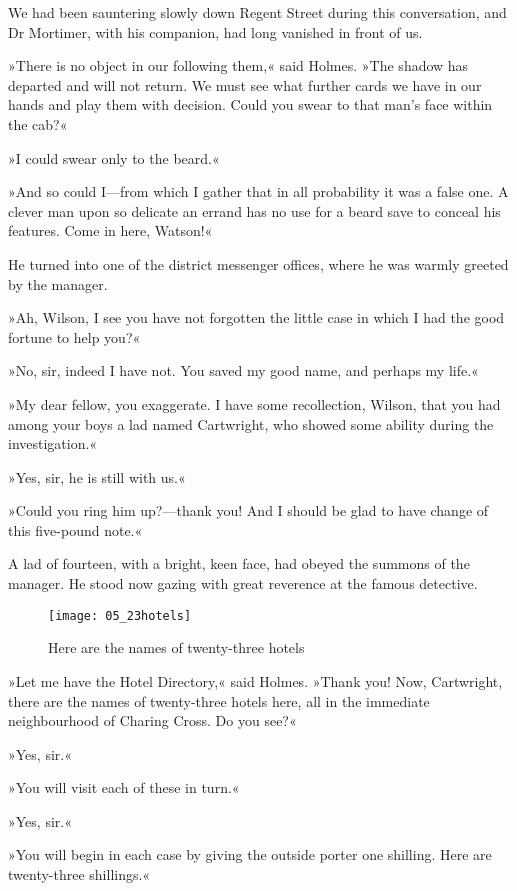 We had been sauntering slowly down Regent Street during this conversation, and Dr Mortimer, with his companion, had long vanished in front of us.

»There is no object in our following them,« said Holmes. »The shadow has departed and will not return. We must see what further cards we have in our hands and play them with decision. Could you swear to that man's face within the cab?«

»I could swear only to the beard.«

»And so could I—from which I gather that in all probability it was a false one. A clever man upon so delicate an errand has no use for a beard save to conceal his features. Come in here, Watson!«

He turned into one of the district messenger offices, where he was warmly greeted by the manager.

»Ah, Wilson, I see you have not forgotten the little case in which I had the good fortune to help you?«

»No, sir, indeed I have not. You saved my good name, and perhaps my life.«

»My dear fellow, you exaggerate. I have some recollection, Wilson, that you had among your boys a lad named Cartwright, who showed some ability during the investigation.«

»Yes, sir, he is still with us.«

»Could you ring him up?—thank you! And I should be glad to have change of this five-pound note.«

A lad of fourteen, with a bright, keen face, had obeyed the summons of the manager. He stood now gazing with great reverence at the famous detective.

\begin{figure}[tbph]
\centering
\texttt{[image: 05\_23hotels]}
\caption{Here are the names of twenty-three hotels}
\end{figure}

»Let me have the Hotel Directory,« said Holmes. »Thank you! Now, Cartwright, there are the names of twenty-three hotels here, all in the immediate neighbourhood of Charing Cross. Do you see?«

»Yes, sir.«

»You will visit each of these in turn.«

»Yes, sir.«

»You will begin in each case by giving the outside porter one shilling. Here are twenty-three shillings.«

